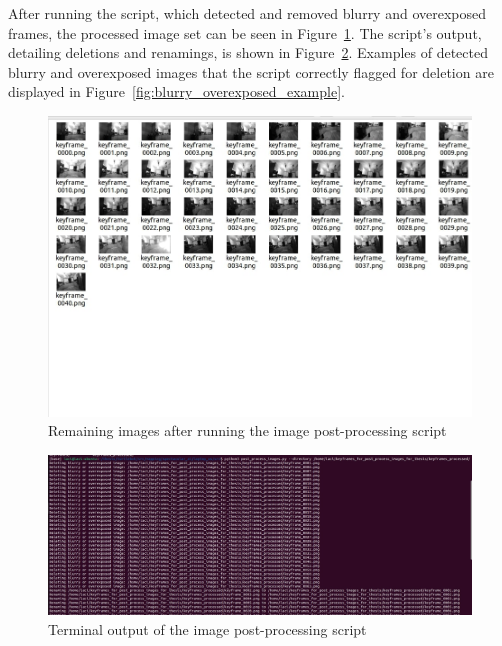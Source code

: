 After running the script, which detected and removed blurry and overexposed frames, the processed image set can be seen in Figure~\ref{fig:keyframes_after_process}. The script’s output, detailing deletions and renamings, is shown in Figure~\ref{fig:image_process_script_output}. Examples of detected blurry and overexposed images that the script correctly flagged for deletion are displayed in Figure~\ref{fig:blurry_overexposed_example}.

\FloatBarrier
\begin{figure}[htbp]
	\centering
	\includegraphics[width=150mm, keepaspectratio]{figures_jpg/keyframes_after_process.jpg}
	\caption{Remaining images after running the image post-processing script}
	\label{fig:keyframes_after_process}
\end{figure}

\begin{figure}[htbp]
	\centering
	\includegraphics[width=150mm, keepaspectratio]{figures_jpg/process_script_output.jpg}
	\caption{Terminal output of the image post-processing script}
	\label{fig:image_process_script_output}
\end{figure}


